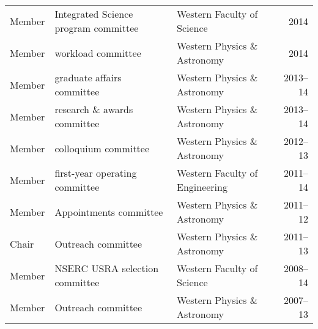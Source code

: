 \begin{tabularx}{\textwidth}{lXXr}
Member& Integrated Science program committee&  Western Faculty of Science& 2014\\
Member& workload committee&  Western Physics \& Astronomy& 2014\\
Member& graduate affairs committee&  Western Physics \& Astronomy& 2013--14\\
Member& research \& awards committee&  Western Physics \& Astronomy& 2013--14\\
Member& colloquium committee& Western Physics \& Astronomy& 2012--13\\
Member& first-year operating committee& Western Faculty of Engineering &  2011--14\\
Member & Appointments committee& Western Physics \& Astronomy& 2011--12\\
Chair& Outreach committee& Western Physics \& Astronomy& 2011--13\\
Member&  NSERC USRA selection committee& Western Faculty of Science& 2008--14\\
Member&  Outreach committee& Western Physics \& Astronomy& 2007--13\\
\end{tabularx}

